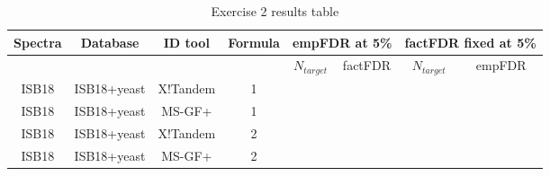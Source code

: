 \begin{table}[htbp]
	\centering
		\begin{tabular}{|c|c|c|c|c|c|c|c|}
				Spectra & Database & ID tool & Formula & \multicolumn{2}{|c|}{empFDR at 5\%} & \multicolumn{2}{|c|}{factFDR fixed at 5\%}\\ \hline
				 &  &  &  & $N_{target}$ & factFDR & $N_{target}$ & empFDR\\ \hline\hline
				ISB18 & ISB18+yeast & X!Tandem & 1 &  &  &  & \\
				ISB18 & ISB18+yeast & MS-GF+ & 1 &  &  &  & \\
				ISB18 & ISB18+yeast & X!Tandem & 2 &  &  &  & \\
				ISB18 & ISB18+yeast & MS-GF+ & 2 &  &  &  & 
		\end{tabular}
	\caption{Exercise 2 results table}
	\label{tab:Exercise2Results}
\end{table}


